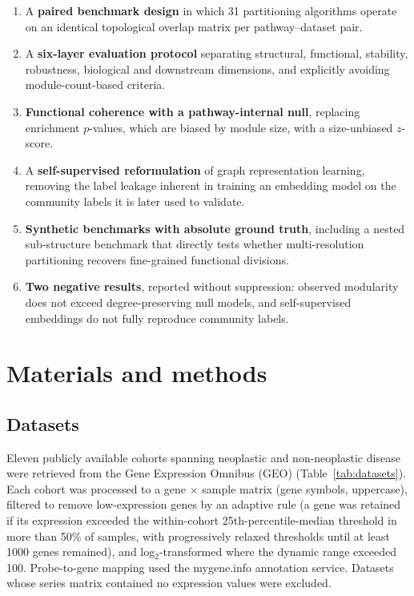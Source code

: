 \documentclass[twocolumn,11pt]{article}
\begin{document}
\begin{enumerate}
\item A \textbf{paired benchmark design} in which 31 partitioning algorithms operate on an
identical topological overlap matrix per pathway--dataset pair.
\item A \textbf{six-layer evaluation protocol} separating structural, functional,
stability, robustness, biological and downstream dimensions, and explicitly avoiding
module-count-based criteria.
\item \textbf{Functional coherence with a pathway-internal null}, replacing enrichment
$p$-values, which are biased by module size, with a size-unbiased $z$-score.
\item A \textbf{self-supervised reformulation} of graph representation learning, removing
the label leakage inherent in training an embedding model on the community labels it is
later used to validate.
\item \textbf{Synthetic benchmarks with absolute ground truth}, including a nested
sub-structure benchmark that directly tests whether multi-resolution partitioning recovers
fine-grained functional divisions.
\item \textbf{Two negative results}, reported without suppression: observed modularity
does not exceed degree-preserving null models, and self-supervised embeddings do not fully
reproduce community labels.
\end{enumerate}

\section{Materials and methods}

\subsection{Datasets}

Eleven publicly available cohorts spanning neoplastic and non-neoplastic disease were
retrieved from the Gene Expression Omnibus (GEO) (Table~\ref{tab:datasets}). Each cohort
was processed to a gene $\times$ sample matrix (gene symbols, uppercase), filtered to
remove low-expression genes by an adaptive rule (a gene was retained if its expression
exceeded the within-cohort 25th-percentile-median threshold in more than 50\% of samples,
with progressively relaxed thresholds until at least 1000 genes remained), and
log$_2$-transformed where the dynamic range exceeded 100. Probe-to-gene mapping used the
mygene.info annotation service. Datasets whose series matrix contained no expression
values were excluded.
\end{document}
